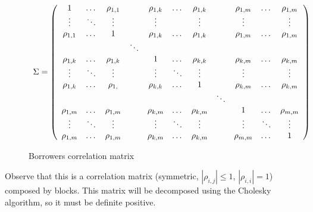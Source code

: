 \documentclass[a4paper,12pt,final]{article}
\begin{document}
\begin{figure}[!hb]
\begin{displaymath}
\begin{array}{c}
\Sigma=
\left(
\begin{array}{ccccccccccc}
1           & \dots    & \rho_{1,1}  &          & \rho_{1,k}  & \dots   & \rho_{1,k}  &         & \rho_{1,m}  & \dots      & \rho_{1,m}  \cr
\vdots      & \ddots   & \vdots      &          & \vdots      &         & \vdots      &         & \vdots      &            & \vdots      \cr
\rho_{1,1}  & \dots    & 1           &          & \rho_{1,k}  & \dots   & \rho_{1,k}  &         & \rho_{1,m}  & \dots      & \rho_{1,m}  \cr

            &          &             & \ddots   &             &         &             &         &             &            &             \cr

\rho_{1,k}  & \dots    & \rho_{1,k}  &          & 1           & \dots   & \rho_{k,k}  &         & \rho_{k,m}  & \dots      & \rho_{k,m}  \cr
\vdots      & \ddots   & \vdots      &          & \vdots      & \ddots  & \vdots      &         & \vdots      &            & \vdots      \cr
\rho_{1,k}  & \dots    & \rho_{1, }  &          & \rho_{k,k}  & \dots   & 1           &         & \rho_{k,m}  & \dots      & \rho_{k,m}  \cr

            &          &             &          &             &         &             & \ddots  &             &            &             \cr

\rho_{1,m}  & \dots    & \rho_{1,m}  &          & \rho_{k,m}  & \dots   & \rho_{k,m}  &         & 1           & \dots      & \rho_{m,m}  \cr
\vdots      & \ddots   & \vdots      &          & \vdots      & \ddots  & \vdots      &         & \vdots      & \ddots     & \vdots      \cr
\rho_{1,m}  & \dots    & \rho_{1,m}  &          & \rho_{k,m}  & \dots   & \rho_{k,m}  &         & \rho_{m,m}  & \dots      & 1           \end{array}
\right)
\end{array}
\end{displaymath}
\caption{Borrowers correlation matrix}
\label{borrowercorrel}
\end{figure}

Observe that this is a correlation matrix (symmetric, $|\rho_{i,j}| \leq 1$, 
$|\rho_{i,i}| = 1$) composed by blocks. This matrix will be decomposed using 
the Cholesky algorithm, so it must be definite positive.

\end{document}
